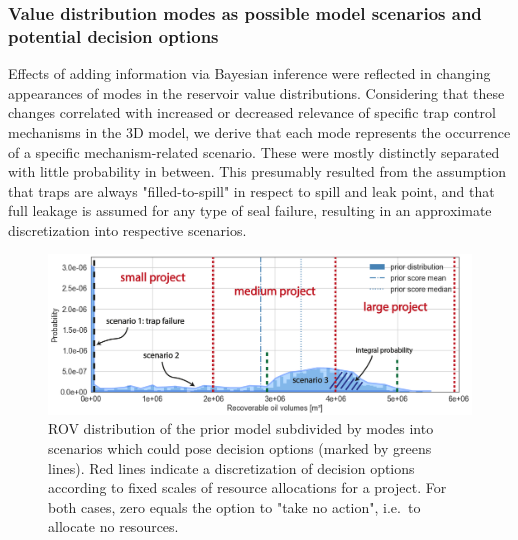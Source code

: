 	\subsubsection{Value distribution modes as possible model scenarios and potential decision options}	
	Effects of adding information via Bayesian inference were reflected in changing appearances of modes in the reservoir value distributions. Considering that these changes correlated with increased or decreased relevance of specific trap control mechanisms in the 3D model, we derive that each mode represents the occurrence of a specific mechanism-related scenario. These were mostly distinctly separated with little probability in between. This presumably resulted from the assumption that traps are always "filled-to-spill" in respect to spill and leak point, and that full leakage is assumed for any type of seal failure, resulting in an approximate discretization into respective scenarios.
	\begin{figure}[h]
		\centering
		\includegraphics[width=1\textwidth]{Figures/scenarios_options}
		\caption{ROV distribution of the prior model subdivided by modes into scenarios which could pose decision options (marked by greens lines). Red lines indicate a discretization of decision options according to fixed scales of resource allocations for a project. For both cases, zero equals the option to "take no action", i.e.\ to allocate no resources.}\label{fig:scenarios_options}
	\end{figure}\\
